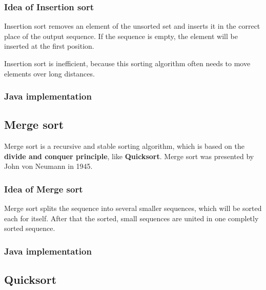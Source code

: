 \documentclass[11pt, a4paper, titlepage, twoside]{article}
\renewcommand{\emph}{\textbf}
\begin{document}
	\subsubsection{Idea of Insertion sort}
	
	Insertion sort removes an element of the unsorted set and inserts it in the correct place of the output sequence. If the sequence is empty, the element will be inserted at the first position.
	
	Insertion sort is inefficient, because this sorting algorithm often needs to move elements over long distances.
	
	\subsubsection{Java implementation}
	
	
	
	\subsection{Merge sort}
	
	Merge sort is a recursive and stable sorting algorithm, which is based on the \emph{divide and conquer principle}, like \emph{Quicksort}. Merge sort was presented by John von Neumann in 1945.
	
	\subsubsection{Idea of Merge sort}
	
	Merge sort splits the sequence into several smaller sequences, which will be sorted each for itself. After that the sorted, small sequences are united in one completly sorted sequence.
	
	\subsubsection{Java implementation}
	
	
	
	\subsection{Quicksort}
	
\end{document}
